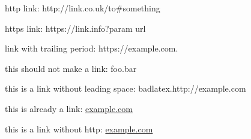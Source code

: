\documentclass{article}
\begin{document}
http link: http://link.co.uk/to\#something

https link: https://link.info?param url

link with trailing period: https://example.com.

this should not make a link: foo.bar

this is a link without leading space: badlatex.http://example.com

this is already a link: \href{http://example.com}{example.com}

this is a link without http: \href{example.com}{example.com}
\end{document}
